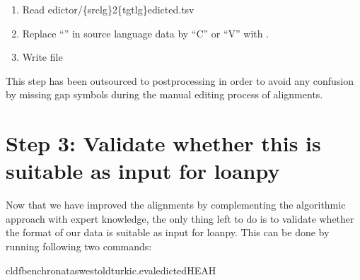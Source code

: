 \documentclass[letterpaper,10pt,english]{sphinxmanual}
\begin{document}

\begin{fulllineitems}
\label{\detokenize{mkedictor:ronataswestoldturkiccommands.cvgapedicted.run}}
\pysigstartsignatures
{}
\pysigstopsignatures\begin{enumerate}
%
\item {} 
\sphinxAtStartPar
Read edictor/\{srclg\}2\{tgtlg\}edicted.tsv

\item {} 
\sphinxAtStartPar
Replace “\sphinxhyphen{}” in source language data by “C” or “V” with
.

\item {} 
\sphinxAtStartPar
Write file

\end{enumerate}

\end{fulllineitems}


\sphinxAtStartPar
This step has been outsourced to post\sphinxhyphen{}processing in order to avoid any
confusion by missing gap symbols during the manual editing process of
alignments.


\section{Step 3: Validate whether this is suitable as input for loanpy}
\label{\detokenize{mkedictor:step-3-validate-whether-this-is-suitable-as-input-for-loanpy}}
\sphinxAtStartPar
Now that we have improved the alignments by complementing the algorithmic
approach with expert knowledge, the only thing left to do is to validate
whether the format of our data is suitable as input for loanpy. This can be
done by running following two commands:

\begin{sphinxVerbatim}[commandchars=\\\{\}]
cldfbenchronataswestoldturkic.evaledictedHEAH
\end{sphinxVerbatim}
\end{document}
